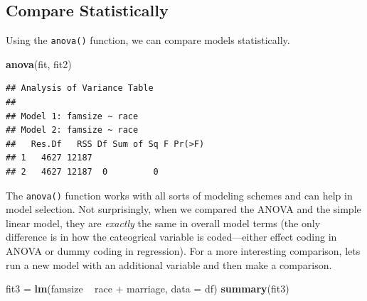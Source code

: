 \documentclass[]{tufte-book}
\newenvironment{Shaded}{}{}
\newcommand{\KeywordTok}[1]{\textcolor[rgb]{0.00,0.44,0.13}{\textbf{#1}}}
\newcommand{\DataTypeTok}[1]{\textcolor[rgb]{0.56,0.13,0.00}{#1}}
\newcommand{\StringTok}[1]{\textcolor[rgb]{0.25,0.44,0.63}{#1}}
\newcommand{\OperatorTok}[1]{\textcolor[rgb]{0.40,0.40,0.40}{#1}}
\newcommand{\NormalTok}[1]{#1}
\theoremstyle{definition}
\theoremstyle{definition}
\theoremstyle{remark}
\begin{document}
\subsection*{Compare Statistically}\label{compare-statistically}

Using the \texttt{anova()} function, we can compare models
statistically.

\begin{Shaded}
\begin{Highlighting}[]
\KeywordTok{anova}\NormalTok{(fit, fit2)}
\end{Highlighting}
\end{Shaded}

\begin{verbatim}
## Analysis of Variance Table
## 
## Model 1: famsize ~ race
## Model 2: famsize ~ race
##   Res.Df   RSS Df Sum of Sq F Pr(>F)
## 1   4627 12187                      
## 2   4627 12187  0         0
\end{verbatim}

The \texttt{anova()} function works with all sorts of modeling schemes
and can help in model selection. Not surprisingly, when we compared the
ANOVA and the simple linear model, they are \emph{exactly} the same in
overall model terms (the only difference is in how the cateogrical
variable is coded---either effect coding in ANOVA or dummy coding in
regression). For a more interesting comparison, lets run a new model
with an additional variable and then make a comparison.

\begin{Shaded}
\begin{Highlighting}[]
\NormalTok{fit3 =}\StringTok{ }\KeywordTok{lm}\NormalTok{(famsize }\OperatorTok{~}\StringTok{ }\NormalTok{race }\OperatorTok{+}\StringTok{ }\NormalTok{marriage, }\DataTypeTok{data =}\NormalTok{ df)}
\KeywordTok{summary}\NormalTok{(fit3)}
\end{Highlighting}
\end{Shaded}
\end{document}

